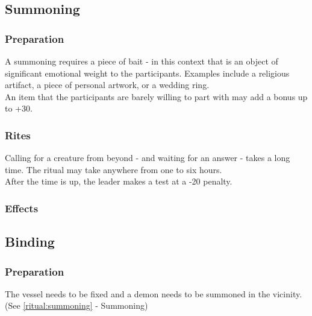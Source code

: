 %
\subsection*{Summoning}
\label{ritual:summoning}
\subsubsection*{Preparation}
A summoning requires a piece of bait -
in this context that is an object of significant emotional weight to the participants.
Examples include a religious artifact, a piece of personal artwork, or a wedding ring.
\\%
An item that the participants are barely willing to part with may add a bonus up to +30.
\subsubsection*{Rites}
Calling for a creature from beyond - and waiting for an answer - takes a long time.
The ritual may take anywhere from one to six hours.
\\%
After the time is up, the leader makes a test at a -20 penalty.
\subsubsection*{Effects}

\subsection*{Binding}
\label{ritual:binding}
\subsubsection*{Preparation}
The vessel needs to be fixed and a demon needs to be summoned in the vicinity.
(See \ref{ritual:summoning} - Summoning)
